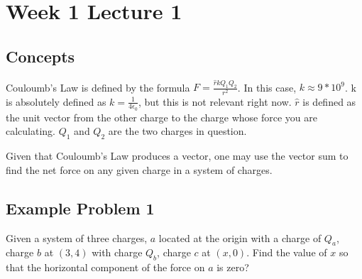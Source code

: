 \documentclass[12pt]{report}
\begin{document}
\chapter*{Week 1 Lecture 1}
\section*{Concepts}
Couloumb's Law is defined by the formula $F = \frac{\hat{r} k Q_1 Q_2}{r^2}$. In this case, $k \approx 9 * 10^9$. k is absolutely defined as $k = \frac{1}{4 \epsilon_{0}}$, but this is not relevant right now. $\hat{r}$ is defined as the unit vector from the other charge to the charge whose force you are calculating. $Q_1$ and $Q_2$ are the two charges in question.

Given that Couloumb's Law produces a vector, one may use the vector sum to find the net force on any given charge in a system of charges. 

\section*{Example Problem 1}
Given a system of three charges, $a$ located at the origin with a charge of $Q_a$, charge $b$ at $(3, 4)$ with charge $Q_b$, charge $c$ at $(x, 0)$. Find the value of $x$ so that the horizontal component of the force on $a$ is zero?
\end{document}
